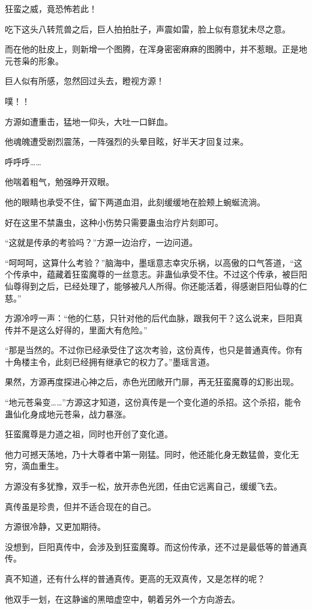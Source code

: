\begin{this_body}
狂蛮之威，竟恐怖若此！

吃下这头八转荒兽之后，巨人拍拍肚子，声震如雷，脸上似有意犹未尽之意。

而在他的肚皮上，则新增一个图腾，在浑身密密麻麻的图腾中，并不惹眼。正是地元苍枭的形象。

巨人似有所感，忽然回过头去，瞪视方源！

噗！！

方源如遭重击，猛地一仰头，大吐一口鲜血。

他魂魄遭受剧烈震荡，一阵强烈的头晕目眩，好半天才回复过来。

呼呼呼……

他喘着粗气，勉强睁开双眼。

他的眼睛也承受不住，留下两道血泪，此刻缓缓地在脸颊上蜿蜒流淌。

好在这里不禁蛊虫，这种小伤势只需要蛊虫治疗片刻即可。

“这就是传承的考验吗？”方源一边治疗，一边问道。

“呵呵呵，这算什么考验？”脑海中，墨瑶意志幸灾乐祸，以高傲的口气答道，“这个传承中，蕴藏着狂蛮魔尊的一丝意志。非蛊仙承受不住。不过这个传承，被巨阳仙尊得到之后，已经处理了，能够被凡人所得。你还能活着，得感谢巨阳仙尊的仁慈。”

方源冷哼一声：“他的仁慈，只针对他的后代血脉，跟我何干？这么说来，巨阳真传并不是这么好得的，里面大有危险。”

“那是当然的。不过你已经承受住了这次考验，这份真传，也只是普通真传。你有十角楼主令，此刻已经拥有继承它的权力了。”墨瑶言道。

果然，方源再度探进心神之后，赤色光团敞开门扉，再无狂蛮魔尊的幻影出现。

“地元苍枭变……”方源这才知道，这份真传是一个变化道的杀招。这个杀招，能令蛊仙化身成地元苍枭，战力暴涨。

狂蛮魔尊是力道之祖，同时也开创了变化道。

他力可撼天荡地，乃十大尊者中第一刚猛。同时，他还能化身无数猛兽，变化无穷，滴血重生。

方源没有多犹豫，双手一松，放开赤色光团，任由它远离自己，缓缓飞去。

真传虽是珍贵，但并不适合现在的自己。

方源很冷静，又更加期待。

没想到，巨阳真传中，会涉及到狂蛮魔尊。而这份传承，还不过是最低等的普通真传。

真不知道，还有什么样的普通真传。更高的无双真传，又是怎样的呢？

他双手一划，在这静谧的黑暗虚空中，朝着另外一个方向游去。

\end{this_body}

